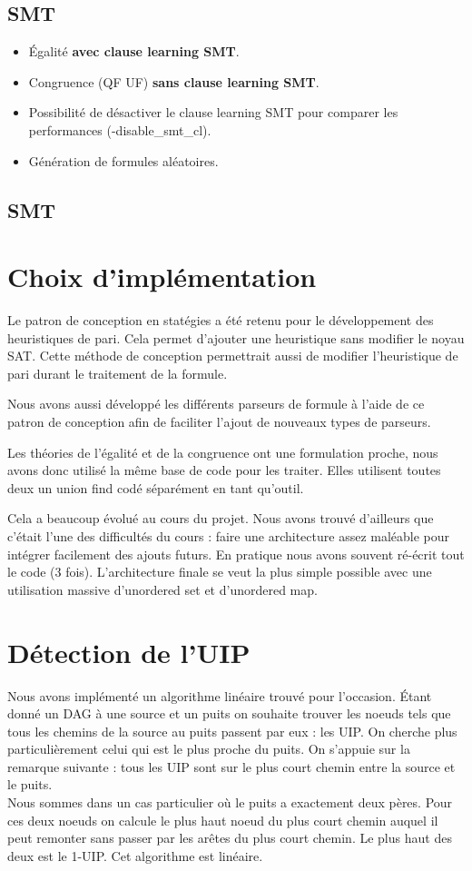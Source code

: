 \documentclass{article}
\begin{document}
\subsection{SMT}
\begin{itemize}
\item Égalité \textbf{avec clause learning SMT}.
\item Congruence (QF UF) \textbf{sans clause learning SMT}.
\item Possibilité de désactiver le clause learning SMT pour comparer les performances (-disable\_smt\_cl).
\item Génération de formules aléatoires.
\end{itemize}
\subsection{SMT}

\section{Choix d'implémentation}
Le patron de conception en statégies a été retenu pour le développement des heuristiques de pari. Cela permet d'ajouter une heuristique sans modifier le noyau SAT. 
Cette méthode de conception permettrait aussi de modifier l'heuristique de pari durant le traitement de la formule.

Nous avons aussi développé les différents parseurs de formule à l'aide de ce patron de conception afin de faciliter l'ajout de nouveaux types de parseurs.

Les théories de l'égalité et de la congruence ont une formulation proche, nous avons donc utilisé la même base de code pour les traiter.
Elles utilisent toutes deux un union find codé séparément en tant qu'outil.

Cela a beaucoup évolué au cours du projet. Nous avons trouvé d'ailleurs que c'était l'une des difficultés du cours : faire une architecture assez maléable pour intégrer facilement des ajouts futurs. En pratique nous avons souvent ré-écrit tout le code (3 fois).
L'architecture finale se veut la plus simple possible avec une utilisation massive d'unordered set et d'unordered map.

\section{Détection de l'UIP}
Nous avons implémenté un algorithme linéaire trouvé pour l'occasion. Étant donné un DAG à une source et un puits on souhaite trouver les noeuds tels que tous les chemins de la source au puits passent par eux : les UIP. On cherche plus particulièrement celui qui est le plus proche du puits.
On s'appuie sur la remarque suivante : tous les UIP sont sur le plus court chemin entre la source et le puits. \\
Nous sommes dans un cas particulier où le puits a exactement deux pères. Pour ces deux noeuds on calcule le plus haut noeud du plus court chemin auquel il peut remonter sans passer par les arêtes du plus court chemin. Le plus haut des deux est le 1-UIP. Cet algorithme est linéaire.
\end{document}

